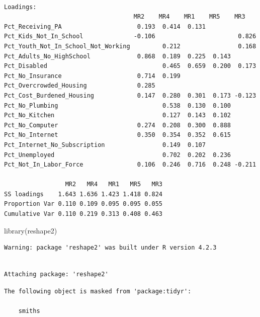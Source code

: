 \documentclass[
  letterpaper,
  DIV=11,
  numbers=noendperiod]{scrreprt}
\newenvironment{Shaded}{\begin{snugshade}}{\end{snugshade}}
\newcommand{\FunctionTok}[1]{\textcolor[rgb]{0.28,0.35,0.67}{#1}}
\newcommand{\NormalTok}[1]{\textcolor[rgb]{0.00,0.23,0.31}{#1}}
\begin{document}
\begin{verbatim}

Loadings:
                                    MR2    MR4    MR1    MR5    MR3   
Pct_Receiving_PA                     0.193  0.414  0.131              
Pct_Kids_Not_In_School              -0.106                       0.826
Pct_Youth_Not_In_School_Not_Working         0.212                0.168
Pct_Adults_No_HighSchool             0.868  0.189  0.225  0.143       
Pct_Disabled                                0.465  0.659  0.200  0.173
Pct_No_Insurance                     0.714  0.199                     
Pct_Overcrowded_Housing              0.285                            
Pct_Cost_Burdened_Housing            0.147  0.280  0.301  0.173 -0.123
Pct_No_Plumbing                             0.538  0.130  0.100       
Pct_No_Kitchen                              0.127  0.143  0.102       
Pct_No_Computer                      0.274  0.208  0.300  0.888       
Pct_No_Internet                      0.350  0.354  0.352  0.615       
Pct_Internet_No_Subscription                0.149  0.107              
Pct_Unemployed                              0.702  0.202  0.236       
Pct_Not_In_Labor_Force               0.106  0.246  0.716  0.248 -0.211

                 MR2   MR4   MR1   MR5   MR3
SS loadings    1.643 1.636 1.423 1.418 0.824
Proportion Var 0.110 0.109 0.095 0.095 0.055
Cumulative Var 0.110 0.219 0.313 0.408 0.463
\end{verbatim}

\begin{Shaded}
\begin{Highlighting}[]
\FunctionTok{library}\NormalTok{(reshape2)}
\end{Highlighting}
\end{Shaded}

\begin{verbatim}
Warning: package 'reshape2' was built under R version 4.2.3
\end{verbatim}

\begin{verbatim}

Attaching package: 'reshape2'
\end{verbatim}

\begin{verbatim}
The following object is masked from 'package:tidyr':

    smiths
\end{verbatim}
\end{document}
